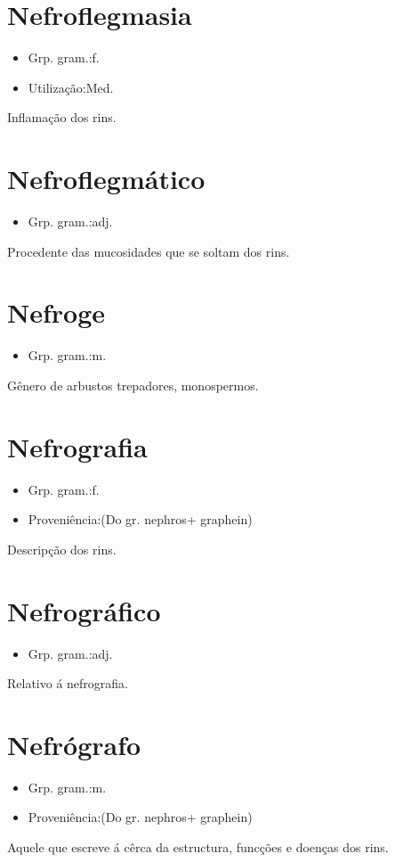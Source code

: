 \section{Nefroflegmasia}
\begin{itemize}
\item {Grp. gram.:f.}
\end{itemize}
\begin{itemize}
\item {Utilização:Med.}
\end{itemize}
Inflamação dos rins.
\section{Nefroflegmático}
\begin{itemize}
\item {Grp. gram.:adj.}
\end{itemize}
Procedente das mucosidades que se soltam dos rins.
\section{Nefroge}
\begin{itemize}
\item {Grp. gram.:m.}
\end{itemize}
Gênero de arbustos trepadores, monospermos.
\section{Nefrografia}
\begin{itemize}
\item {Grp. gram.:f.}
\end{itemize}
\begin{itemize}
\item {Proveniência:(Do gr. \textunderscore nephros\textunderscore  + \textunderscore graphein\textunderscore )}
\end{itemize}
Descripção dos rins.
\section{Nefrográfico}
\begin{itemize}
\item {Grp. gram.:adj.}
\end{itemize}
Relativo á nefrografia.
\section{Nefrógrafo}
\begin{itemize}
\item {Grp. gram.:m.}
\end{itemize}
\begin{itemize}
\item {Proveniência:(Do gr. \textunderscore nephros\textunderscore  + \textunderscore graphein\textunderscore )}
\end{itemize}
Aquele que escreve á cêrca da estructura, funcções e doenças dos rins.
